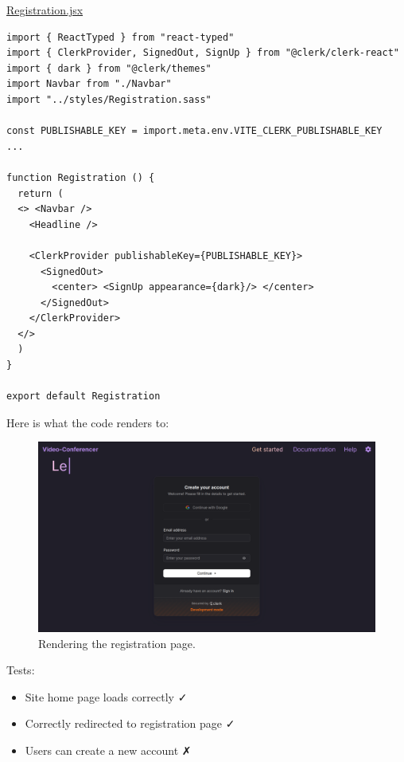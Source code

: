 \underline{Registration.jsx}
\begin{verbatim}
import { ReactTyped } from "react-typed"
import { ClerkProvider, SignedOut, SignUp } from "@clerk/clerk-react"
import { dark } from "@clerk/themes"
import Navbar from "./Navbar" 
import "../styles/Registration.sass"

const PUBLISHABLE_KEY = import.meta.env.VITE_CLERK_PUBLISHABLE_KEY
...

function Registration () {
  return (
  <> <Navbar />
    <Headline />
    
    <ClerkProvider publishableKey={PUBLISHABLE_KEY}>
      <SignedOut>
        <center> <SignUp appearance={dark}/> </center>
      </SignedOut>
    </ClerkProvider>
  </>
  )
}

export default Registration
\end{verbatim}

Here is what the code renders to:

\begin{figure}[H]
\centering

\includegraphics[scale=0.2]{Images/Registration.png}

\caption{Rendering the registration page.}
\end{figure}

{\color{gray} \hrulefill}
\vspace{0.2cm}

{\sffamily Tests:}
\begin{itemize}
  \item Site home page loads correctly \faCheck \\
  \item Correctly redirected to registration page \faCheck \\
  \item Users can create a new account \faClose \\
\end{itemize}

